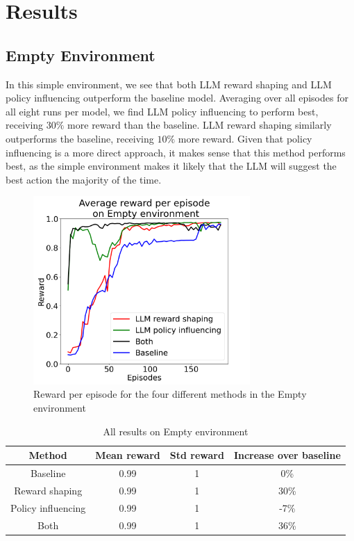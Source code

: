 \documentclass[conference]{IEEEtran}
\begin{document}
\section{Results}

\subsection{Empty Environment}

In this simple environment, we see that both LLM reward shaping and LLM policy influencing outperform the baseline model. Averaging over all episodes for all eight runs per model, we find LLM policy influencing to perform best, receiving $30\%$ more reward than the baseline. LLM reward shaping similarly outperforms the baseline, receiving $10\%$ more reward. Given that policy influencing is a more direct approach, it makes sense that this method performs best, as the simple environment makes it likely that the LLM will suggest the best action the majority of the time.

\begin{figure}[h]
\centerline{\includegraphics[width=3.25in]{figure/emptyresults.png}}
\caption{Reward per episode for the four different methods in the Empty environment}
\label{doorkeyresults}
\end{figure}

\begin{table}[h]
\caption{All results on Empty environment}
\begin{center}
\label{emptytable}
\begin{tabular}{c | c c c}
Method & Mean reward & Std reward & Increase over baseline \\
\hline
Baseline & 0.99 & 1 & 0\% \\
Reward shaping & 0.99 & 1 & 30\% \\
Policy influencing & 0.99 & 1 & -7\% \\
Both & 0.99 & 1 & 36\% \\
\end{tabular}
\end{center}
\end{table}
\end{document}
